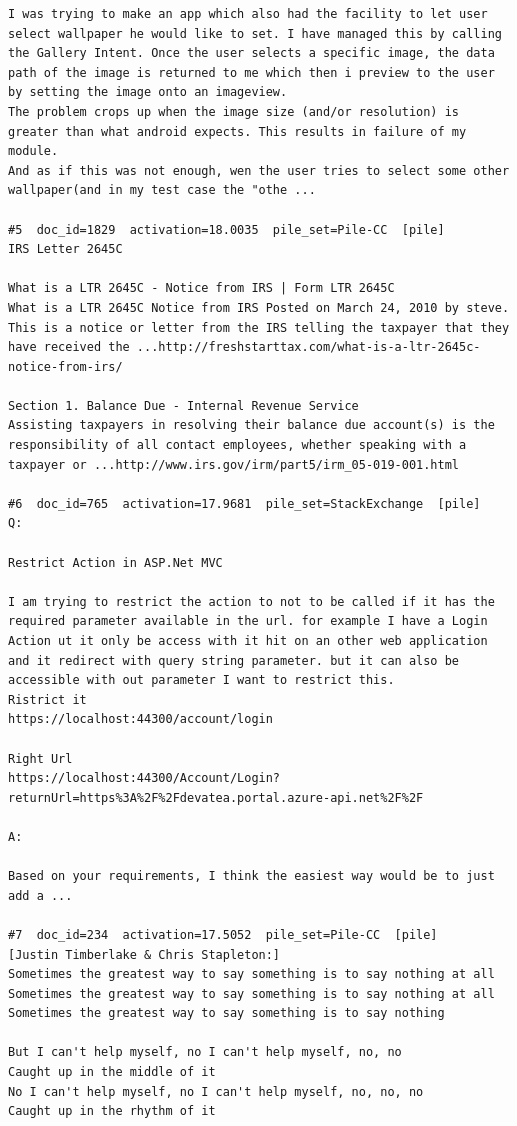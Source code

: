 \begin{verbatim}
I was trying to make an app which also had the facility to let user select wallpaper he would like to set. I have managed this by calling the Gallery Intent. Once the user selects a specific image, the data path of the image is returned to me which then i preview to the user by setting the image onto an imageview.
The problem crops up when the image size (and/or resolution) is greater than what android expects. This results in failure of my module. 
And as if this was not enough, wen the user tries to select some other wallpaper(and in my test case the "othe ...

#5  doc_id=1829  activation=18.0035  pile_set=Pile-CC  [pile]
IRS Letter 2645C

What is a LTR 2645C - Notice from IRS | Form LTR 2645C
What is a LTR 2645C Notice from IRS Posted on March 24, 2010 by steve. This is a notice or letter from the IRS telling the taxpayer that they have received the ...http://freshstarttax.com/what-is-a-ltr-2645c-notice-from-irs/

Section 1. Balance Due - Internal Revenue Service
Assisting taxpayers in resolving their balance due account(s) is the responsibility of all contact employees, whether speaking with a taxpayer or ...http://www.irs.gov/irm/part5/irm_05-019-001.html

#6  doc_id=765  activation=17.9681  pile_set=StackExchange  [pile]
Q:

Restrict Action in ASP.Net MVC

I am trying to restrict the action to not to be called if it has the required parameter available in the url. for example I have a Login Action ut it only be access with it hit on an other web application and it redirect with query string parameter. but it can also be accessible with out parameter I want to restrict this.   
Ristrict it
https://localhost:44300/account/login

Right Url
https://localhost:44300/Account/Login?returnUrl=https%3A%2F%2Fdevatea.portal.azure-api.net%2F%2F

A:

Based on your requirements, I think the easiest way would be to just add a ...

#7  doc_id=234  activation=17.5052  pile_set=Pile-CC  [pile]
[Justin Timberlake & Chris Stapleton:]
Sometimes the greatest way to say something is to say nothing at all
Sometimes the greatest way to say something is to say nothing at all
Sometimes the greatest way to say something is to say nothing

But I can't help myself, no I can't help myself, no, no
Caught up in the middle of it
No I can't help myself, no I can't help myself, no, no, no
Caught up in the rhythm of it


\end{verbatim}
